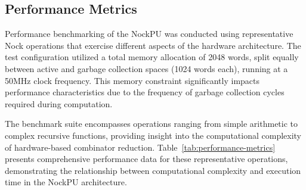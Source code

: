 \documentclass[twoside]{article}
\begin{document}
\subsection{Performance Metrics}

Performance benchmarking of the NockPU was conducted using representative Nock operations that exercise different aspects of the hardware architecture. The test configuration utilized a total memory allocation of 2048 words, split equally between active and garbage collection spaces (1024 words each), running at a 50MHz clock frequency. This memory constraint significantly impacts performance characteristics due to the frequency of garbage collection cycles required during computation.

The benchmark suite encompasses operations ranging from simple arithmetic to complex recursive functions, providing insight into the computational complexity of hardware-based combinator reduction. Table~\ref{tab:performance-metrics} presents comprehensive performance data for these representative operations, demonstrating the relationship between computational complexity and execution time in the NockPU architecture.

\begin{table}[h]
\centering
\caption{NockPU Performance Metrics: clock of 50MHz and 16,384 bytes of memory}
\label{tab:performance-metrics}
\end{table}
\end{document}
